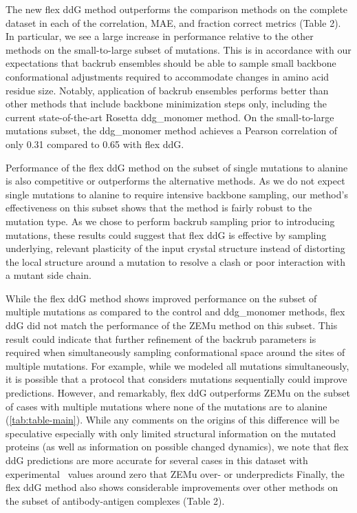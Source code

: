 The new flex ddG method outperforms the comparison methods on the complete dataset in each of the correlation, MAE, and fraction correct metrics (Table 2). In particular, we see a large increase in performance relative to the other methods on the small-to-large subset of mutations. This is in accordance with our expectations that backrub ensembles should be able to sample small backbone conformational adjustments required to accommodate changes in amino acid residue size. Notably, application of backrub ensembles performs better than other methods that include backbone minimization steps only, including the current state-of-the-art Rosetta ddg\_monomer method. On the small-to-large mutations subset, the ddg\_monomer method achieves a Pearson correlation of only 0.31 compared to 0.65 with flex ddG.

Performance of the flex ddG method on the subset of single mutations to alanine is also competitive or outperforms the alternative methods.
As we do not expect single mutations to alanine to require intensive backbone sampling, our method's effectiveness on this subset shows that the method is fairly robust to the mutation type.
As we chose to perform backrub sampling prior to introducing mutations, these results could suggest that flex ddG is effective by sampling underlying, relevant plasticity of the input crystal structure instead of distorting the local structure around a mutation to resolve a clash or poor interaction with a mutant side chain.

While the flex ddG method shows improved performance on the subset of multiple mutations as compared to the control and ddg\_monomer methods, flex ddG did not match the performance of the ZEMu method on this subset.
This result could indicate that further refinement of the backrub parameters is required when simultaneously sampling conformational space around the sites of multiple mutations.
For example, while we modeled all mutations simultaneously, it is possible that a protocol that considers mutations sequentially could improve predictions.
However, and remarkably, flex ddG outperforms ZEMu on the subset of cases with multiple mutations where none of the mutations are to alanine (\cref{tab:table-main}).
While any comments on the origins of this difference will be speculative especially with only limited structural information on the mutated proteins (as well as information on possible changed dynamics), we note that flex ddG predictions are more accurate for several cases in this dataset with experimental \ddg\ values around zero that ZEMu over- or underpredicts
Finally, the flex ddG method also shows considerable improvements over other methods on the subset of antibody-antigen complexes (Table 2).


